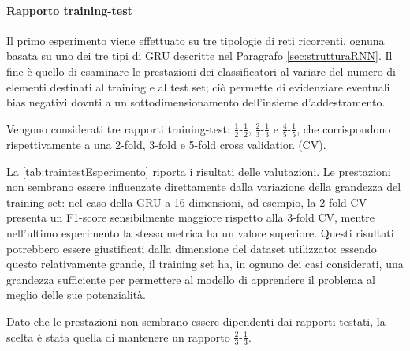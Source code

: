 \documentclass[../../main.tex]{subfiles}
\begin{document}
    \paragraph{Rapporto training-test}
    Il primo esperimento viene effettuato su tre tipologie di reti ricorrenti, ognuna basata su uno dei tre tipi di GRU descritte nel Paragrafo \ref{sec:strutturaRNN}. Il fine è quello di esaminare le prestazioni dei classificatori al variare del numero di elementi destinati al training e al test set; ciò permette di evidenziare eventuali bias negativi dovuti a un sottodimensionamento dell'insieme d'addestramento. 

    Vengono considerati tre rapporti training-test: $\frac{1}{2}$-$\frac{1}{2}$, $\frac{2}{3}$-$\frac{1}{3}$ e $\frac{4}{5}$-$\frac{1}{5}$, che corrispondono rispettivamente a una 2-fold, 3-fold e 5-fold cross validation (CV).

    La \cref{tab:traintestEsperimento} riporta i risultati delle valutazioni. Le prestazioni non sembrano essere influenzate direttamente dalla variazione della grandezza del training set: nel caso della GRU a 16 dimensioni, ad esempio, la 2-fold CV presenta un F1-score sensibilmente maggiore rispetto alla 3-fold CV, mentre nell'ultimo esperimento la stessa metrica ha un valore superiore. Questi risultati potrebbero essere giustificati dalla dimensione del dataset utilizzato: essendo questo relativamente grande, il training set ha, in ognuno dei casi considerati, una grandezza sufficiente per permettere al modello di apprendere il problema al meglio delle sue potenzialità.

    Dato che le prestazioni non sembrano essere dipendenti dai rapporti testati, la scelta è stata quella di mantenere un rapporto $\frac{2}{3}$-$\frac{1}{3}$.
\end{document}
